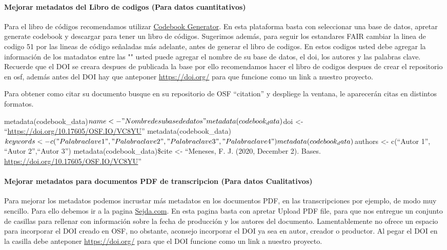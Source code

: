 \documentclass[
  14pt,
]{book}
\begin{document}
\hypertarget{mejorar-metadatos-del-libro-de-codigos-para-datos-cuantitativos}{%
\paragraph{Mejorar metadatos del Libro de codigos (Para datos cuantitativos)}\label{mejorar-metadatos-del-libro-de-codigos-para-datos-cuantitativos}}

Para el libro de códigos recomendamos utilizar \href{https://opencpu.psych.bio.uni-goettingen.de/ocpu/library/codebook/www/}{Codebook Generator}. En esta plataforma basta con seleccionar una base de datos, apretar generate codebook y descargar para tener un libro de códigos. Sugerimos además, para seguir los estandares FAIR cambiar la linea de codigo 51 por las lineas de código señaladas más adelante, antes de generar el libro de codigos. En estos codigos usted debe agregar la información de los matadatos entre las "" usted puede agregar el nombre de su base de datos, el doi, los autores y las palabras clave. Recuerde que el DOI se creara despues de publicada la base por ello recomendamos hacer el libro de codigos despues de crear el repositorio en osf, además antes del DOI hay que anteponer \url{https://doi.org/} para que funcione como un link a nuestro proyecto.

Para obtener como citar su documento busque en su repositorio de OSF ``citation'' y despliege la ventana, le aparecerán citas en distintos formatos.

metadata(codebook\_data)\(name <- "Nombre de su base de datos" metadata(codebook_data)\)doi \textless- ``\url{https://doi.org/10.17605/OSF.IO/VC8YU}''
metadata(codebook\_data)\(keywords <- c("Palabra clave 1", "Palabra clave 2","Palabra clave 3","Palabra clave 4" ) metadata(codebook_data)\)authors \textless- c(``Autor 1'', ``Autor 2'',``Autor 3'')
metadata(codebook\_data)\$cite \textless- ``Meneses, F. J. (2020, December 2). Bases. \url{https://doi.org/10.17605/OSF.IO/VC8YU}''

\hypertarget{mejorar-metadatos-para-documentos-pdf-de-transcripcion-para-datos-cualitativos}{%
\paragraph{Mejorar metadatos para documentos PDF de transcripcion (Para datos Cualitativos)}\label{mejorar-metadatos-para-documentos-pdf-de-transcripcion-para-datos-cualitativos}}

Para mejorar los metadatos podemos incrustar más metadatos en los documentos PDF, en las transcripciones por ejemplo, de modo muy sencillo. Para ello debemos ir a la pagina \href{https://www.sejda.com/edit-pdf-metadata}{Sejda.com}. En esta pagina basta con apretar Upload PDF file, para que nos entregue un conjunto de casillas para rellenar con información sobre la fecha de producción y los autores del documento. Lamentablemente no ofrece un espacio para incorporar el DOI creado en OSF, no obstante, aconsejo incorporar el DOI ya sea en autor, creador o productor. Al pegar el DOI en la casilla debe anteponer \url{https://doi.org/} para que el DOI funcione como un link a nuestro proyecto.
\end{document}
